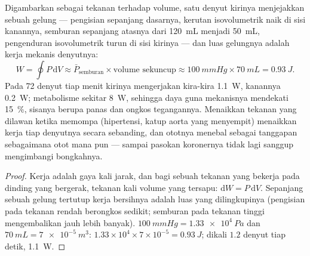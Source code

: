 \begin{theorem}\label{thm:b2:heart:work}
Digambarkan sebagai tekanan terhadap volume, satu denyut  kirinya
menjejakkan sebuah gelung --- pengisian sepanjang dasarnya, kerutan
isovolumetrik naik di sisi kanannya, semburan sepanjang atasnya dari
\qty{120}{mL} menjadi \qty{50}{mL}, pengenduran isovolumetrik turun di
sisi kirinya --- dan luas gelungnya adalah kerja mekanis denyutnya:
\[
W = \oint P\,\mathrm{d}V \approx \bar P_{\text{semburan}}\times \text{volume sekuncup} \approx \qty{100}{mmHg}\times\qty{70}{mL} = \qty{0.93}{J}.
\]
Pada 72 denyut tiap menit  kirinya mengerjakan kira-kira
\qty{1.1}{W},  kanannya \qty{0.2}{W}; metabolisme 
sekitar \qty{8}{W}, sehingga daya guna mekanisnya mendekati
\qty{15}{\%}, sisanya berupa panas dan ongkos tegangannya. Menaikkan
tekanan yang dilawan  ketika memompa (hipertensi, katup
aorta yang menyempit) menaikkan kerja tiap denyutnya secara sebanding,
dan ototnya menebal sebagai tanggapan sebagaimana otot mana pun ---
sampai pasokan koronernya tidak lagi sanggup mengimbangi bongkahnya.
\end{theorem}
\begin{proof}
Kerja adalah gaya kali jarak, dan bagi sebuah tekanan yang bekerja pada
dinding yang bergerak, tekanan kali volume yang tersapu: $\mathrm{d}W = P\,\mathrm{d}V$.
Sepanjang sebuah gelung tertutup kerja bersihnya adalah luas yang
dilingkupinya (pengisian pada tekanan rendah berongkos sedikit;
semburan pada tekanan tinggi mengembalikan jauh lebih banyak).
$\qty{100}{mmHg} = \qty{1.33e4}{Pa}$ dan $\qty{70}{mL} =
\qty{7e-5}{m^3}$: $1.33\times 10^{4}\times 7\times 10^{-5} =
\qty{0.93}{J}$; dikali $1.2$ denyut tiap detik, \qty{1.1}{W}.
\end{proof}

